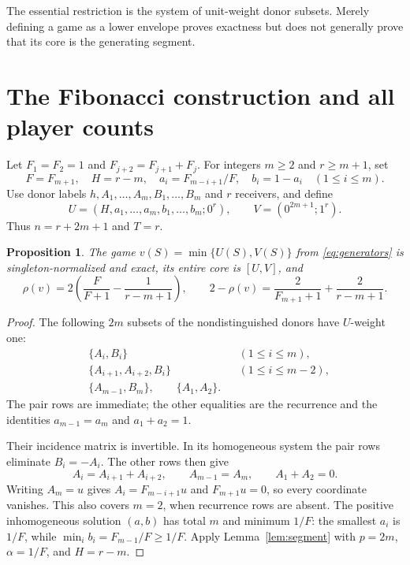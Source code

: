 \documentclass[11pt]{article}
\newtheorem{proposition}[theorem]{Proposition}
\begin{document}
The essential restriction is the system of unit-weight donor subsets.
Merely defining a game as a lower envelope proves exactness but does not
generally prove that its core is the generating segment.

\section{The Fibonacci construction and all player counts}

Let $F_1=F_2=1$ and $F_{j+2}=F_{j+1}+F_j$. For integers $m\ge2$ and
$r\ge m+1$, set
\[
 F=F_{m+1},\quad H=r-m,\quad
 a_i=F_{m-i+1}/F,\quad b_i=1-a_i\quad(1\le i\le m).
\]
Use donor labels $h,A_1,\ldots,A_m,B_1,\ldots,B_m$ and $r$ receivers,
and define
\begin{equation}\label{eq:generators}
 U=(H,a_1,\ldots,a_m,b_1,\ldots,b_m;0^r),\qquad
 V=(0^{2m+1};1^r).
\end{equation}
Thus $n=r+2m+1$ and $T=r$.

\begin{proposition}\label{prop:fibonacci}
The game $v(S)=\min\{U(S),V(S)\}$ from \eqref{eq:generators} is
singleton-normalized and exact, its entire core is $[U,V]$, and
\begin{equation}\label{eq:fibonacci-deficit}
 \rho(v)=2\left(\frac{F}{F+1}-\frac1{r-m+1}\right),
 \qquad 2-\rho(v)=\frac2{F_{m+1}+1}+\frac2{r-m+1}.
\end{equation}
\end{proposition}

\begin{proof}
The following $2m$ subsets of the nondistinguished donors have $U$-weight
one:
\begin{align*}
 &\{A_i,B_i\} &&(1\le i\le m),\\
 &\{A_{i+1},A_{i+2},B_i\} &&(1\le i\le m-2),\\
 &\{A_{m-1},B_m\},\qquad \{A_1,A_2\}.&&
\end{align*}
The pair rows are immediate; the other equalities are the recurrence and
the identities $a_{m-1}=a_m$ and $a_1+a_2=1$.

Their incidence matrix is invertible. In its homogeneous system the pair
rows eliminate $B_i=-A_i$. The other rows then give
\[
 A_i=A_{i+1}+A_{i+2},\qquad A_{m-1}=A_m,
 \qquad A_1+A_2=0.
\]
Writing $A_m=u$ gives $A_i=F_{m-i+1}u$ and $F_{m+1}u=0$, so every
coordinate vanishes. This also covers $m=2$, when recurrence rows are
absent. The positive inhomogeneous solution $(a,b)$ has total $m$ and
minimum $1/F$: the smallest $a_i$ is $1/F$, while
$\min_i b_i=F_{m-1}/F\ge1/F$. Apply Lemma~\ref{lem:segment} with
$p=2m$, $\alpha=1/F$, and $H=r-m$.
\end{proof}
\end{document}
